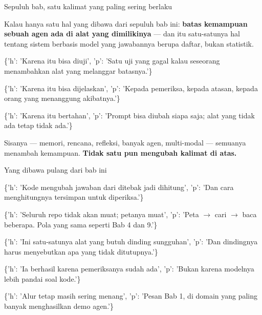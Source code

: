 \documentclass[aspectratio=169,11pt,t]{beamer}
\begin{document}
\begin{frame}[shrink=25]{Sepuluh bab, satu kalimat yang paling sering berlaku}
{\fontsize{9.4}{12.6}\selectfont\color{fg2}Kalau hanya satu hal yang dibawa dari sepuluh bab ini: \textbf{batas kemampuan sebuah agen ada di alat yang dimilikinya} --- dan itu satu-satunya hal tentang sistem berbasis model yang jawabannya berupa daftar, bukan statistik.\par}\vskip 4pt
\begin{isteps}
\item \{'h': 'Karena itu bisa diuji', 'p': 'Satu uji yang gagal kalau seseorang menambahkan alat yang melanggar batasnya.'\}
\item \{'h': 'Karena itu bisa dijelaskan', 'p': 'Kepada pemeriksa, kepada atasan, kepada orang yang menanggung akibatnya.'\}
\item \{'h': 'Karena itu bertahan', 'p': 'Prompt bisa diubah siapa saja; alat yang tidak ada tetap tidak ada.'\}
\end{isteps}
\begin{iband}[signal]
Sisanya --- memori, rencana, refleksi, banyak agen, multi-modal --- semuanya menambah kemampuan. \textbf{Tidak satu pun mengubah kalimat di atas.}
\end{iband}
\end{frame}

\begin{frame}[shrink=25]{Yang dibawa pulang dari bab ini}
\begin{isteps}
\item \{'h': 'Kode mengubah jawaban dari ditebak jadi dihitung', 'p': 'Dan cara menghitungnya tersimpan untuk diperiksa.'\}
\item \{'h': 'Seluruh repo tidak akan muat; petanya muat', 'p': 'Peta $\rightarrow$ cari $\rightarrow$ baca beberapa. Pola yang sama seperti Bab 4 dan 9.'\}
\item \{'h': 'Ini satu-satunya alat yang butuh dinding sungguhan', 'p': 'Dan dindingnya harus menyebutkan apa yang tidak ditutupnya.'\}
\item \{'h': 'Ia berhasil karena pemeriksanya sudah ada', 'p': 'Bukan karena modelnya lebih pandai soal kode.'\}
\item \{'h': 'Alur tetap masih sering menang', 'p': 'Pesan Bab 1, di domain yang paling banyak menghasilkan demo agen.'\}
\end{isteps}
\end{frame}
\end{document}
